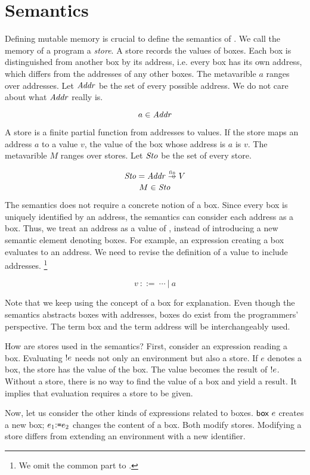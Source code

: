 \section{Semantics}

Defining mutable memory is crucial to define the semantics of \Lang.
We call the memory of a program a \textit{store}. A store records the values of boxes.
Each box is distinguished from another box by its address, i.e. every box has
its own address, which differs from the addresses of any other boxes.
The metavarible $a$ ranges over addresses. Let $\mbox{\emph{Addr}}$ be the set of every
possible address. We do not care about what $\mbox{\emph{Addr}}$ really is.

\[ a \in \mbox{\emph{Addr}} \]

A store is a finite partial function from addresses to values.
If the store maps an address $a$ to a value $v$, the value of the box whose
address is $a$ is $v$. The metavarible $M$ ranges over stores. Let $\mbox{\emph{Sto}}$
be the set of every store.

\[ \embox{Sto} = \embox{Addr}\finto V \]
\[ M \in \mbox{\emph{Sto}} \]

The semantics does not require a concrete notion of a box. Since every
box is uniquely identified by an address, the semantics can consider each
address as a box. Thus, we treat an address as a value of \Lang, instead of
introducing a new semantic element denoting boxes. For example, an expression
creating a box evaluates to an address. We need to revise the definition of a
value to include addresses.
\footnote{We omit the common part to \plang.}

\[ v\ ::=\ \cdots\ |\ a \]

Note that we keep using the concept of a box for explanation.
Even though the semantics abstracts boxes with addresses,
boxes do exist from the programmers' perspective.
The term box and the term address will be interchangeably used.

How are stores used in the semantics? First, consider an expression reading a
box. Evaluating \(!e\) needs not only an environment but also a store.
If $e$ denotes a box, the store has the value of the box. The value becomes
the result of \(!e\). Without a store, there is no way to find the value
of a box and yield a result. It implies that evaluation requires a store to be
given.

Now, let us consider the other kinds of expressions related to boxes.
$\textsf{box}\ e$ creates a new box; $e_1{:}\texttt{=} e_2$ changes
the content of a box. Both modify stores. Modifying a store differs from
extending an environment with a new identifier.

